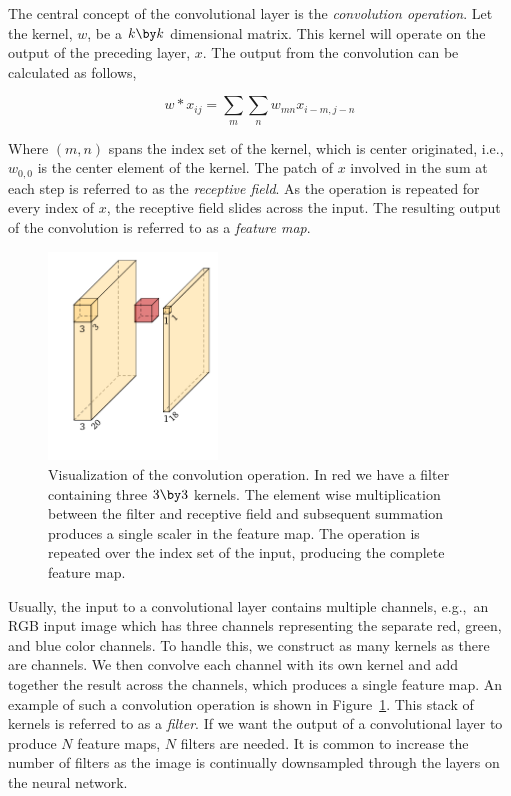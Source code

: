 The central concept of the convolutional layer is the \textit{convolution operation}.
Let the kernel, \(w\), be a \(k\by k\) dimensional matrix.
This kernel will operate on the output of the preceding layer, \(x\).
The output from the convolution can be calculated as follows,

\[w\ast x_{ij}=\sum_{m}\sum_{n}  w_{mn}x_{i-m,j-n}\]

Where \((m,n)\) spans the index set of the kernel, which is center originated, i.e., \(w_{0,0}\) is the center element of the kernel.
The patch of \(x\) involved in the sum at each step is referred to as the \textit{receptive field}.
As the operation is repeated for every index of \(x\), the receptive field slides across the input.
The resulting output of the convolution is referred to as a \textit{feature map}.

\begin{figure}[htb]
  \centering
  \includegraphics[width=0.4\textwidth]{figs/background/conv.pdf}
  \caption[Convolution operation]{Visualization of the convolution operation.
In red we have a filter containing three \(3\by 3\) kernels.
The element wise multiplication between the filter and receptive field and subsequent summation produces a single scaler in the feature map.
The operation is repeated over the index set of the input, producing the complete feature map.}\label{fig:cnn}
\end{figure}

Usually, the input to a convolutional layer contains multiple channels, e.g.,\ an RGB input image which has three channels representing the separate  red, green, and blue color channels.
To handle this, we construct as many kernels as there are channels.
We then convolve each channel with its own kernel and add together the result across the channels, which produces a single feature map.
An example of such a convolution operation is shown in Figure~\ref{fig:cnn}.
This stack of kernels is referred to as a \textit{filter}.
If we want the output of a convolutional layer to produce \(N\) feature maps, \(N\) filters are needed.  It is common to increase the number of filters as the image is continually downsampled through the layers on the neural network.

